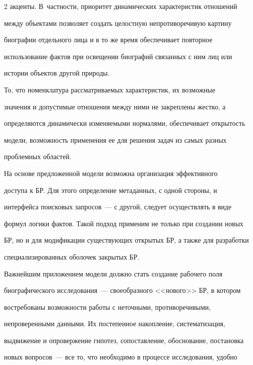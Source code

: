 \begin{multicols}{2}
акценты. В~частности, приоритет динамических характеристик отношений 


между объектами позволяет создать целостную непротиворечивую картину 


биографии отдельного лица и в то же время обеспечивает повторное 


использование фактов при освещении биографий связанных с ним лиц или 


истории объектов другой природы. 


  


  То, что номенклатура рассматриваемых характеристик, их возможные 


значения и допустимые отношения между ними не закреплены жестко, а 


определяются динамически изменяемыми нормалями, обеспечивает открытость 


модели, возможность применения ее для решения задач из самых разных 


проблемных областей.


  


  На основе предложенной модели возможна организация эффективного 


доступа к БР. Для этого определение метаданных, с одной стороны, и 


интерфейса поисковых запросов~--- с другой, следует осуществлять в виде 


формул логики фактов. Такой подход применим не только при создании новых 


БР, но и для модификации существующих открытых БР, а также для разработки 


специализированных оболочек закрытых БР. 


  


  Важнейшим приложением модели должно стать создание рабочего поля 


биографического исследования~--- своеобразного <<нового>> БР, в котором 


востребованы возможности работы с неточными, противоречи\-вы\-ми, 


непроверенными данными. Их постепенное накопление, систематизация, 


выдвижение и опровержение гипотез, сопоставление, обосно\-ва\-ние, постановка 


новых вопросов~--- все то, что необходимо в процессе исследования, удобно 



\end{multicols}
